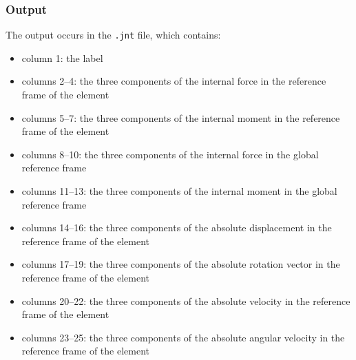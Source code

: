 \subsubsection{Output}
The output occurs in the \texttt{.jnt} file, which contains:
\begin{itemize}
\item column 1: the label

\item columns 2--4: the three components of the internal force in the reference frame of the element

\item columns 5--7: the three components of the internal moment in the reference frame of the element

\item columns 8--10: the three components of the internal force in the global reference frame

\item columns 11--13: the three components of the internal moment in the global reference frame

\item columns 14--16: the three components of the absolute displacement in the reference frame of the element

\item columns 17--19: the three components of the absolute rotation vector in the reference frame of the element

\item columns 20--22: the three components of the absolute velocity in the reference frame of the element

\item columns 23--25: the three components of the absolute angular velocity in the reference frame of the element

\end{itemize}

